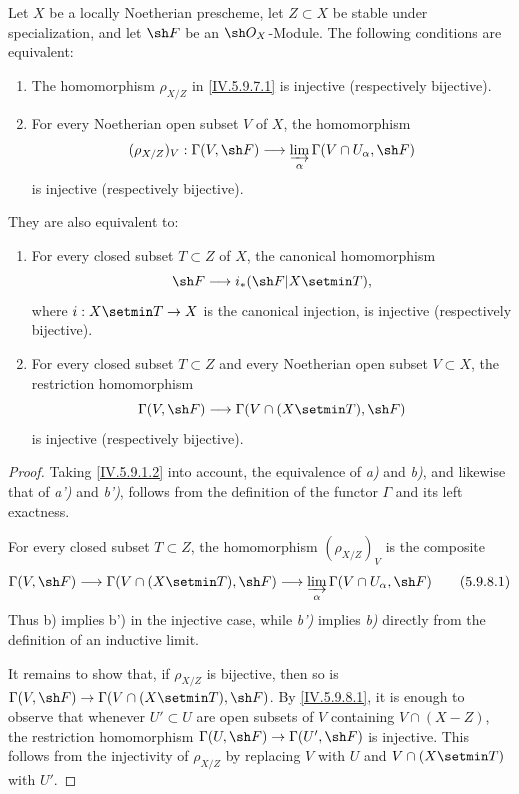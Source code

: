 \begin{proposition}[5.9.8]
\label{IV.5.9.8}
Let $X$ be a locally Noetherian prescheme, let $Z\subset X$ be stable
under specialization, and let $\sh F$ be an $\sh O_X$-Module.  The
following conditions are equivalent:
\begin{enumerate}[{\rm a)}]
  \item\label{IV.5.9.8.a}
    The homomorphism $\rho_{X/Z}$ in \eqref{IV.5.9.7.1} is injective
    (\textup{respectively} bijective).
  \item\label{IV.5.9.8.b}
    For every Noetherian open subset $V$ of $X$, the homomorphism
    \[
      (\rho_{X/Z})_V:\Gamma(V,\sh F)\longrightarrow
      \varinjlim_\alpha\Gamma(V\cap U_\alpha,\sh F)
    \]
    is injective (\textup{respectively} bijective).
\end{enumerate}
They are also equivalent to:
\begin{enumerate}
  \item[{\rm a')}] \label{IV.5.9.8.a-prime}
    For every closed subset $T\subset Z$ of $X$, the canonical
    homomorphism 
    \[
      \sh F\longrightarrow i_*(\sh F|X\setmin T),
    \]
    where $i:X\setmin T\to X$ is the canonical injection, is injective
    (\textup{respectively} bijective).
  \item[{\rm b')}] \label{IV.5.9.8.b-prime}
    For every closed subset $T\subset Z$ and every Noetherian open
    subset $V\subset X$, the restriction homomorphism
    \[
      \Gamma(V,\sh F)\longrightarrow
      \Gamma(V\cap(X\setmin T),\sh F)
    \]
    is injective (\textup{respectively} bijective).
\end{enumerate}
\end{proposition}

\begin{proof}
Taking \eqref{IV.5.9.1.2} into account, the equivalence of \emph{a)} and \emph{b)},
and likewise that of \emph{a')} and \emph{b')}, follows from the definition of the
functor $\Gamma$ and its left exactness.

For every closed subset $T\subset Z$, the homomorphism
$(\rho_{X/Z})_V$ is the composite
\begin{equation}
\label{IV.5.9.8.1}
 \Gamma(V,\sh F)\longrightarrow
 \Gamma(V\cap(X\setmin T),\sh F)\longrightarrow
 \varinjlim_\alpha\Gamma(V\cap U_\alpha,\sh F)
\tag{5.9.8.1}
\end{equation}
Thus b) implies b') in the injective case, while \emph{b')} implies \emph{b)}
directly from the definition of an inductive limit.


It remains to show that, if $\rho_{X/Z}$ is bijective, then so is
$\Gamma(V,\sh F)\to\Gamma(V\cap(X\setmin T),\sh F)$.  By
\eqref{IV.5.9.8.1}, it is enough to observe that whenever
$U'\subset U$ are open subsets of $V$ containing $V\cap(X-Z)$, the
restriction homomorphism
$\Gamma(U,\sh F)\to\Gamma(U',\sh F)$ is injective.  This follows from
the injectivity of $\rho_{X/Z}$ by replacing $V$ with $U$ and
$V\cap(X\setmin T)$ with $U'$.
\end{proof}

